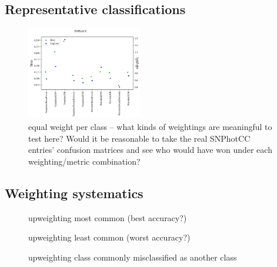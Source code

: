 \subsection{Representative classifications}
\label{sec:realresults}

\begin{figure}
	\begin{center}
		\includegraphics[width=0.45\textwidth]{./fig/SNPhotCC_res.png}
		\caption{equal weight per class -- what kinds of weightings are meaningful to test here?  Would it be reasonable to take the real SNPhotCC entries' confusion matrices and see who would have won under each weighting/metric combination?}
		\label{fig:real_metric_compare}
	\end{center}
\end{figure}

\subsection{Weighting systematics}
\label{sec:weight_res}

\begin{figure}
	\begin{center}
		\caption{upweighting most common (best accuracy?)}
		\label{fig:systematic_common}
	\end{center}
\end{figure}

\begin{figure}
	\begin{center}
		\caption{upweighting least common (worst accuracy?)}
		\label{fig:systematic_rare}
	\end{center}
\end{figure}

\begin{figure}
	\begin{center}
		\caption{upweighting class commonly misclassified as another class}
		\label{fig:systematic_subsumer}
	\end{center}
\end{figure}

